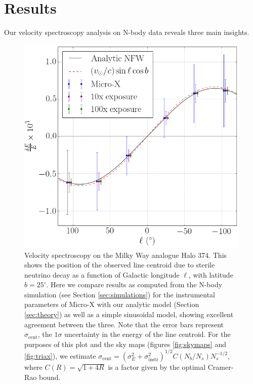\documentclass[aps,prd,10pt,twocolumn,superscriptaddress,showpacs]{revtex4-1}
\begin{document}
\section{Results}
\label{sec:results}

Our velocity spectroscopy analysis on N-body data reveals three main insights.

\begin{figure}[h!]
\centering
\includegraphics[width=1.0\columnwidth]{de_vs_l.png}
\caption{Velocity spectroscopy on the Milky Way analogue Halo 374. This shows the position of the observed line centroid due to sterile
	neutrino decay as a function of Galactic longitude $\ell$, with latitude $b=25^\circ$.
	Here we compare results as computed from the N-body simulation (see Section \ref{sec:simulations}) for the
	instrumental parameters of Micro-X with our analytic model (Section
	\ref{sec:theory}) as well as a simple sinusoidal model, showing excellent agreement between the
	three. Note that the error bars represent $\sigma_{\mathrm{cent}}$, the $1\sigma$ uncertainty
	in the energy of the line centroid. For the
	purposes of this plot and the sky maps (figures \ref{fig:skymaps} and \ref{fig:triax}), we estimate
	$\sigma_\mathrm{cent} = (\sigma_E^2+\sigma_\mathrm{instr}^2)^{1/2}C(N_b/N_s)N_s^{-1/2}$, where
	$C(R)=\sqrt{1+4R}$ is a factor given by the optimal Cramer-Rao bound.}
\label{fig:de_vs_l}
\end{figure}
\end{document}
